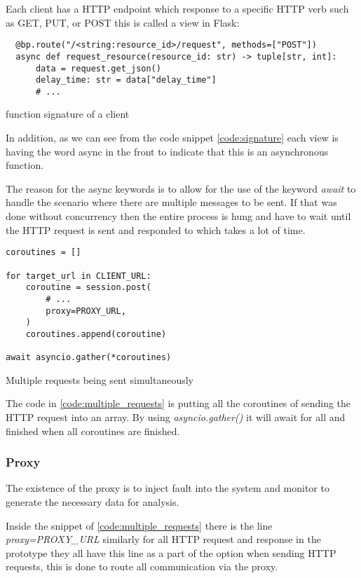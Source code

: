 Each client has a HTTP endpoint which response to a specific HTTP verb such as
GET, PUT, or POST this is called a view in Flask:

\begin{listing}[!ht]
  \begin{verbatim}
  @bp.route("/<string:resource_id>/request", methods=["POST"])
  async def request_resource(resource_id: str) -> tuple[str, int]:
      data = request.get_json()
      delay_time: str = data["delay_time"]
      # ...
  \end{verbatim}
\caption{function signature of a client}
\label{code:signature}
\end{listing}

In addition, as we can see from the code snippet \ref{code:signature}  each view is having the word 
async in the front to indicate that this is an asynchronous function. 

The reason for the async keywords is to allow for the use of the keyword 
\textit{await} to handle the scenario where there are multiple messages to be 
sent. If that was done without concurrency then the entire process is hung 
and have to wait until the HTTP request is sent and responded to which takes a 
lot of time.

\begin{listing}[!ht]
\begin{verbatim}
coroutines = []

for target_url in CLIENT_URL:
    coroutine = session.post(
        # ...
        proxy=PROXY_URL,
    )
    coroutines.append(coroutine)

await asyncio.gather(*coroutines)
\end{verbatim}
\caption{Multiple requests being sent simultaneously}
\label{code:multiple_requests}
\end{listing}


The code in \ref{code:multiple_requests} is putting all the coroutines of sending the HTTP request into 
an array. By using \textit{asyncio.gather()} it will await for all and finished
when all coroutines are finished.


\subsubsection{Proxy}

The existence of the proxy is to inject fault into the system and monitor to 
generate the necessary data for analysis.

Inside the snippet of \ref{code:multiple_requests} there is the line 
\textit{proxy=PROXY\_URL}
similarly for all HTTP request and response in the prototype they all have this line 
as a part of the option when sending HTTP requests, this is done to route all 
communication via the proxy.

